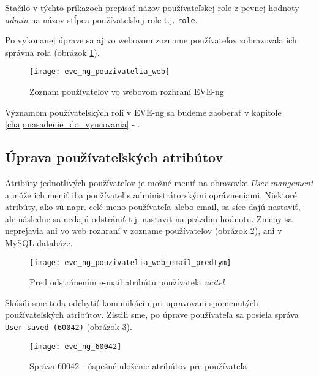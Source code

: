 Stačilo v týchto príkazoch prepísať názov používateľskej role z pevnej hodnoty \emph{admin} na názov stĺpca používateľskej role t.j. \texttt{role}.

Po vykonanej úprave sa aj vo webovom zozname používateľov zobrazovala ich správna rola (obrázok \ref{obr:eve_ng_pouzivatelia_web}).

\begin{figure}
    \centering
    \texttt{[image: eve\_ng\_pouzivatelia\_web]}
    \caption{Zoznam používateľov vo webovom rozhraní EVE-ng}
    \label{obr:eve_ng_pouzivatelia_web}
\end{figure}

Významom používateľských rolí v EVE-ng sa budeme zaoberať v kapitole \ref{chap:nasadenie_do_vyucovania} - .




\subsection{Úprava používateľských atribútov}

Atribúty jednotlivých používateľov je možné meniť na obrazovke \emph{User mangement} a môže ich meniť iba používateľ s administrátorskými oprávneniami. Niektoré atribúty, ako sú napr. celé meno používateľa alebo email, sa síce dajú nastaviť, ale následne sa nedajú odstrániť t.j. nastaviť na prázdnu hodnotu. Zmeny sa neprejavia ani vo web rozhraní v zozname používateľov (obrázok \ref{obr:eve_ng_pouzivatelia_web_email_predtym}), ani v MySQL databáze.

\begin{figure}
    \centering
    \texttt{[image: eve\_ng\_pouzivatelia\_web\_email\_predtym]}
    \caption{Pred odstránením e-mail atribútu používateľa \emph{ucitel}}
    \label{obr:eve_ng_pouzivatelia_web_email_predtym}
\end{figure}

Skúsili sme teda odchytiť komunikáciu pri upravovaní spomenutých používateľských atribútov. Zistili sme, po úprave používateľa sa posiela správa \texttt{User saved (60042)} (obrázok \ref{obr:eve_ng_60042}).

\begin{figure}
    \centering
    \texttt{[image: eve\_ng\_60042]}
    \caption{Správa 60042 - úspešné uloženie atribútov pre používateľa}
    \label{obr:eve_ng_60042}
\end{figure}

